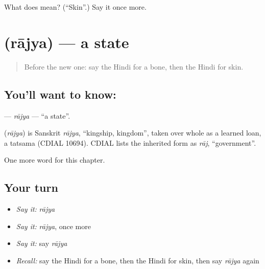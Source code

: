 \begin{tcolorbox}[breakable,colback=teal!4,colframe=teal!35!black,title={Before you move on}]
What does  mean? (\textquotedblleft{}Skin\textquotedblright{}.) Say it once more.
\end{tcolorbox}
\section[\texorpdfstring{\hi{राज्य} (rājya)}{राज्य (rājya)}]{ (rājya) — a state}

\label{lesson:HI-C200-rajya}



\begin{quote}
Before the new one: say the Hindi for a bone, then the Hindi for skin.
\end{quote}

\subsection*{You'll want to know: }
\textbf{} — \emph{rājya} — \textquotedblleft{}a state\textquotedblright{}.

\begin{cousinweb}
\textbf{} (\emph{rājya}) is Sanskrit \emph{rājya}, \textquotedblleft{}kingship, kingdom\textquotedblright{}, taken over whole as a learned loan, a tatsama (CDIAL 10694). CDIAL lists the inherited form as \emph{rāj}, \textquotedblleft{}government\textquotedblright{}.
\end{cousinweb}

\begin{grammarlens}[title={What you've built}]
One more word for this chapter.
\end{grammarlens}

\subsection*{Your turn}
\begin{itemize}
\raggedright
  \item \emph{Say it:} \emph{rājya}
  \item \emph{Say it:} \emph{rājya}, once more
  \item \emph{Say it:} say \emph{rājya}
  \item \emph{Recall:} say the Hindi for a bone, then the Hindi for skin, then say \emph{rājya} again
\end{itemize}

